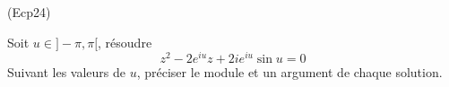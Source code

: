\begin{tiny}(Ecp24)\end{tiny}
Soit $u\in ]-\pi, \pi[$, résoudre
\begin{displaymath}
 z^2 -2e^{iu}z +2ie^{iu}\sin u = 0
\end{displaymath}
Suivant les valeurs de $u$, préciser le module et un argument de chaque solution.